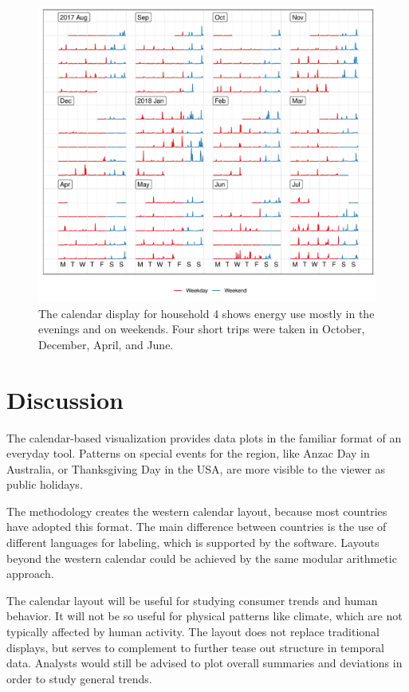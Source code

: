 \documentclass[12pt]{article}
\begin{document}
\begin{figure}

{\centering \includegraphics[width=\textwidth]{figure/h4-1} 

}

\caption{The calendar display for household 4 shows energy use mostly in the evenings and on weekends. Four short trips were taken in October, December, April, and June.}\label{fig:h4}
\end{figure}

\hypertarget{sec:discussion}{%
\section{Discussion}\label{sec:discussion}}

The calendar-based visualization provides data plots in the familiar format of an everyday tool. Patterns on special events for the region, like Anzac Day in Australia, or Thanksgiving Day in the USA, are more visible to the viewer as public holidays.

The methodology creates the western calendar layout, because most countries have adopted this format. The main difference between countries is the use of different languages for labeling, which is supported by the software. Layouts beyond the western calendar could be achieved by the same modular arithmetic approach.

The calendar layout will be useful for studying consumer trends and human behavior. It will not be so useful for physical patterns like climate, which are not typically affected by human activity. The layout does not replace traditional displays, but serves to complement to further tease out structure in temporal data. Analysts would still be advised to plot overall summaries and deviations in order to study general trends.
\end{document}
